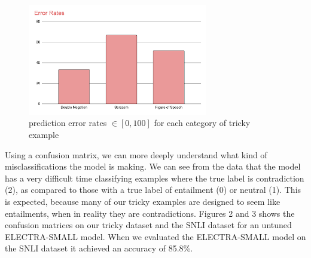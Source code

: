 \documentclass{article}
\begin{document}
\begin{figure}[!h]
	\centering
	\includegraphics[width=0.7\textwidth]{images/error_rates.png}
	\caption{prediction error rates $\in [0, 100]$ for each category of tricky example}
\end{figure}

Using a confusion matrix, we can more deeply understand what kind of misclassifications the model is making. We can see from the data that the model has a very
difficult time classifying examples where the true label is contradiction (2), as compared to those with a true label of entailment (0) or neutral (1). This is expected, because many of our tricky examples
are designed to seem like entailments, when in reality they are contradictions. Figures 2 and 3 shows the confusion
matrices on our tricky dataset and the SNLI dataset for an untuned ELECTRA-SMALL model. When we evaluated the ELECTRA-SMALL
model on the SNLI dataset it achieved an accuracy of 85.8\%.
\end{document}
